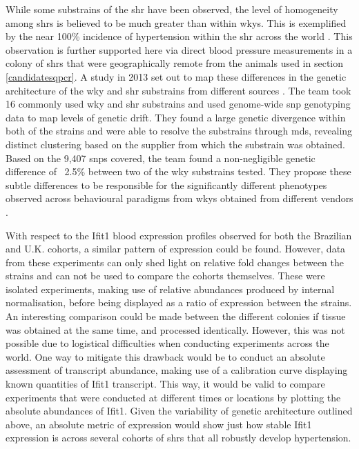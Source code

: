 While some substrains of the \acrshort{shr} have been observed, the level of homogeneity among \acrshort{shr}s is believed to be much greater than within \acrshort{wky}s. This is exemplified by the near 100\% incidence of hypertension within the \acrshort{shr} across the world \cite{Louis1990,NAP20031}. This observation is further supported here via direct blood pressure measurements in a colony of \acrshort{shr}s that were geographically remote from the animals used in section \ref{candidatesqpcr}. A study in 2013 set out to map these differences in the genetic architecture of the \acrshort{wky} and \acrshort{shr} substrains from different sources \cite{doi:10.1152/physiolgenomics.00002.2013}. The team took 16 commonly used \acrshort{wky} and \acrshort{shr} substrains and used genome-wide \acrshort{snp} genotyping data to map levels of genetic drift. They found a large genetic divergence within both of the strains and were able to resolve the substrains through \acrfull{mds}, revealing distinct clustering based on the supplier from which the substrain was obtained. Based on the 9,407 \acrshort{snp}s covered, the team found a non-negligible genetic difference of ~2.5\% between two of the \acrshort{wky} substrains tested. They propose these subtle differences to be responsible for the significantly different phenotypes observed across behavioural paradigms from \acrshort{wky}s obtained from different vendors \cite{Pare1997}. 

With respect to the Ifit1 blood expression profiles observed for both the Brazilian and U.K. cohorts, a similar pattern of expression could be found. However, data from these experiments can only shed light on relative fold changes between the strains and can not be used to compare the cohorts themselves. These were isolated experiments, making use of relative abundances produced by internal normalisation, before being displayed as a ratio of expression between the strains. An interesting comparison could be made between the different colonies if tissue was obtained at the same time, and processed identically. However, this was not possible due to logistical difficulties when conducting experiments across the world. One way to mitigate this drawback would be to conduct an absolute assessment of transcript abundance, making use of a calibration curve displaying known quantities of Ifit1 transcript. This way, it would be valid to compare experiments that were conducted at different times or locations by plotting the absolute abundances of Ifit1. Given the variability of genetic architecture outlined above, an absolute metric of expression would show just how stable Ifit1 expression is across several cohorts of \acrshort{shr}s that all robustly develop hypertension. 

